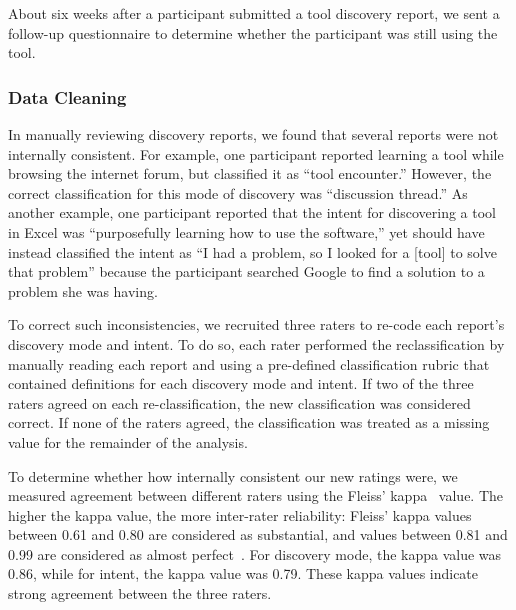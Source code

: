 \documentclass[smallextended]{svjour3}
\begin{document}
About six weeks after a participant submitted a tool discovery report,
we sent a follow-up questionnaire to determine whether the participant was still
using the tool.

\subsubsection{Data Cleaning}\label{sec:cleaning}

\noindent
In manually reviewing discovery reports, we found that several reports
were not internally consistent.
For example, one participant reported learning a tool while browsing the internet forum,
but classified it as ``tool encounter.''
However, the correct classification for this mode of discovery was ``discussion thread.''
As another example, one participant reported that the intent for discovering 
a tool in Excel was ``purposefully learning how to use the software,'' 
yet should have instead classified the intent as ``I had a problem,
so I looked for a [tool] to solve that problem''
because the participant searched Google to find a solution to a problem she was having.

To correct such inconsistencies, we recruited three raters to re-code each report's 
discovery mode and intent.
To do so, each rater performed the reclassification by manually reading each report 
and using a pre-defined classification rubric that contained definitions 
for each discovery mode and intent.
If two of the three raters agreed on each re-classification, the new classification
was considered correct.
If none of the raters agreed, the classification was treated as a missing value for
the remainder of the analysis.

To determine whether how internally consistent our new ratings were,
we measured agreement between different raters using the Fleiss' kappa~\cite{fleiss1981measurement} value.
The higher the kappa value, the more inter-rater reliability:
Fleiss' kappa values between 0.61 and 0.80 are considered as substantial, 
and values between 0.81 and 0.99 are considered as almost perfect~\cite{landis77}. 
For discovery mode, the kappa value was 0.86, 
while for intent, the kappa value was 0.79.
These kappa values indicate strong agreement between the three raters.  
 
\end{document}
